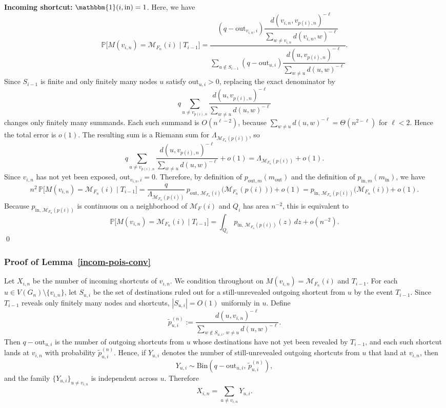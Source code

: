 \documentclass[10pt]{amsart}
\begin{document}
\noindent\textbf{Incoming shortcut: } $\mathbbm{1}(i,\mathrm{in})=1$.
Here, we have 
\[
\mathbb P\big[M(v_{i,n})=\mathcal M_{F_n}(i)\mid T_{i-1}\big]
=
\frac{
(q-\mathrm{out}_{v_{i,n},i})
\dfrac{d(v_{i,n},v_{p(i),n})^{-\ell}}
{\sum_{w\neq v_{i,n}} d(v_{i,n},w)^{-\ell}}
}
{
\sum_{u \notin S_{i-1}}
(q-\mathrm{out}_{u,i})
\dfrac{d(u,v_{p(i),n})^{-\ell}}
{\sum_{w\neq u} d(u,w)^{-\ell}}
}.
\]
Since \(S_{i-1}\) is finite and only finitely many nodes \(u\) satisfy
\(\mathrm{out}_{u,i}>0\), replacing the exact denominator by
\[
q\sum_{u\neq v_{p(i),n}}
\frac{d(u,v_{p(i),n})^{-\ell}}{\sum_{w\neq u} d(u,w)^{-\ell}}
\]
changes only finitely many summands. Each such summand is \(O(n^{\ell-2})\),
because \(\sum_{w\neq u} d(u,w)^{-\ell}=\Theta(n^{2-\ell})\) for \(\ell<2\).
Hence the total error is \(o(1)\). The resulting sum is a Riemann sum for
\(\Lambda_{\mathcal M_{F_n}(p(i))}\), so
\[
q\sum_{u \neq v_{p(i),n}}
\frac{d(u, v_{p(i),n})^{-\ell}}
{\sum_{w\neq u} d(u,w)^{-\ell}}
+o(1)
=
\Lambda_{\mathcal M_{F_n}(p(i))} + o(1).
\]
Since $v_{i,n}$ has not yet been exposed, $\mathrm{out}_{v_{i,n},i}=0$. Therefore, by definition of
$p_{\mathrm{out},m}(m_{\mathrm{out}})$ and the definition of
$p_{\mathrm{in},m}(m_{\mathrm{in}})$, we have
\[
n^2\,\mathbb P\big[M(v_{i,n})=\mathcal M_{F_n}(i)\mid T_{i-1}\big]
=
\frac{q}{\Lambda_{\mathcal M_{F_n}(p(i))}}
\,p_{\mathrm{out},\,\mathcal M_{F_n}(i)}\big(\mathcal M_{F_n}(p(i))\big)
+o(1)
=
p_{\mathrm{in},\,\mathcal M_{F_n}(p(i))}\big(\mathcal M_{F_n}(i)\big)
+o(1).
\]
Because
$p_{\mathrm{in},\,\mathcal M_{F_n}(p(i))}$ is continuous on a neighborhood of \(\mathcal M_{F}(i)\) and $Q_i$ has area
$n^{-2}$, this is equivalent to
\[
\mathbb P\big[M(v_{i,n})=\mathcal M_{F_n}(i)\mid T_{i-1}\big]
=
\int_{Q_i} p_{\mathrm{in},\,\mathcal M_{F_n}(p(i))}(z)\,dz + o(n^{-2}).
\]
\qed


\subsubsection*{Proof of Lemma~\ref{incom-pois-conv}}


Let \(X_{i,n}\) be the number of incoming shortcuts of \(v_{i,n}\). We condition throughout on
\(
M(v_{i,n})=\mathcal M_{F_n}(i) \) and \( T_{i-1}.\)
For each \(u\in V(G_n)\setminus\{v_{i,n}\}\), let \(S_{u,i}\) be the set of destinations ruled out for a still-unrevealed outgoing shortcut from \(u\) by the event \(T_{i-1}\). Since \(T_{i-1}\) reveals only finitely many nodes and shortcuts, \(|S_{u,i}|=O(1)\) uniformly in \(u\). Define
\[
\tilde p_{u,i}^{(n)}:=\frac{d(u,v_{i,n})^{-\ell}}{\sum_{w\notin S_{u,i},\,w\neq u} d(u,w)^{-\ell}}.
\]
Then \(q-\mathrm{out}_{u,i}\) is the number of outgoing shortcuts from \(u\) whose destinations have not yet been revealed by \(T_{i-1}\), and each such shortcut lands at \(v_{i,n}\) with probability \(\tilde p_{u,i}^{(n)}\). Hence, if \(Y_{u,i}\) denotes the number of still-unrevealed outgoing shortcuts from \(u\) that land at \(v_{i,n}\), then
\[
Y_{u,i}\sim \mathrm{Bin}\!\left(q-\mathrm{out}_{u,i},\,\tilde p_{u,i}^{(n)}\right),
\]
and the family \(\{Y_{u,i}\}_{u\neq v_{i,n}}\) is independent across \(u\). Therefore
\[
X_{i,n}=\sum_{u\neq v_{i,n}}Y_{u,i}.
\]
\end{document}
